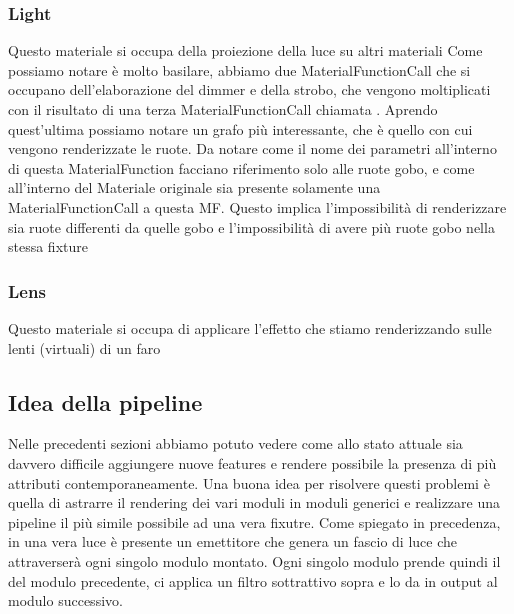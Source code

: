 \documentclass[main.tex]{subfiles}
\begin{document}
\subsubsection{Light}\label{subsec:2_1_light}
Questo materiale si occupa della proiezione della luce su altri materiali
Come possiamo notare è molto basilare, abbiamo due MaterialFunctionCall che si occupano dell'elaborazione del dimmer e della strobo, che vengono moltiplicati con il risultato di una terza MaterialFunctionCall chiamata . Aprendo quest'ultima possiamo notare un grafo più interessante, che è quello con cui vengono renderizzate le ruote.
Da notare come il nome dei parametri all'interno di questa MaterialFunction facciano riferimento solo alle ruote gobo, e come all'interno del Materiale originale sia presente solamente una MaterialFunctionCall a questa MF. Questo implica l'impossibilità di renderizzare sia ruote differenti da quelle gobo e l'impossibilità di avere più ruote gobo nella stessa fixture

\subsubsection{Lens}\label{subsec:2_1_lens}
Questo materiale si occupa di applicare l'effetto che stiamo renderizzando sulle lenti (virtuali) di un faro %


\subsection{Idea della pipeline}\label{subsec:2_pipelineIdea}
Nelle precedenti sezioni abbiamo potuto vedere come allo stato attuale sia davvero difficile aggiungere nuove features e rendere possibile la presenza di più attributi contemporaneamente. Una buona idea per risolvere questi problemi è quella di astrarre il rendering dei vari moduli in moduli generici e realizzare una pipeline il più simile possibile ad una vera fixutre. Come spiegato in precedenza, in una vera luce è presente un emettitore che genera un fascio di luce che attraverserà ogni singolo modulo montato. Ogni singolo modulo prende quindi il  del modulo precedente, ci applica un filtro sottrattivo sopra e lo da in output al modulo successivo. \newline
\end{document}
